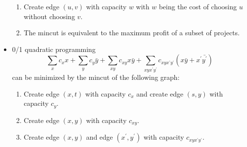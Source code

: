 \begin{itemize}
\begin{enumerate}
      \item Create edge $(u, v)$ with capacity $w$ with $w$ being the cost of choosing $u$ without choosing $v$.
      \item The mincut is equivalent to the maximum profit of a subset of projects.
    \end{enumerate}
    \item 0/1 quadratic programming
    \vspace{-1em}
    \[ \sum_x{c_xx} + \sum_y{c_y\bar{y}} + \sum_{xy}c_{xy}x\bar{y} + \sum_{xyx^\prime y^\prime}c_{xyx^\prime y^\prime}(x\bar{y} + x^\prime\bar{y^\prime}) \]
    can be minimized by the mincut of the following graph:
    \begin{enumerate}
      \itemsep-0.3em
      \item Create edge $(x, t)$ with capacity $c_x$ and create edge $(s, y)$ with capacity $c_y$.
      \item Create edge $(x, y)$ with capacity $c_{xy}$.
      \item Create edge $(x, y)$ and edge $(x^\prime, y^\prime)$ with capacity $c_{xyx^\prime y^\prime}$.
    \end{enumerate}
\end{itemize}
